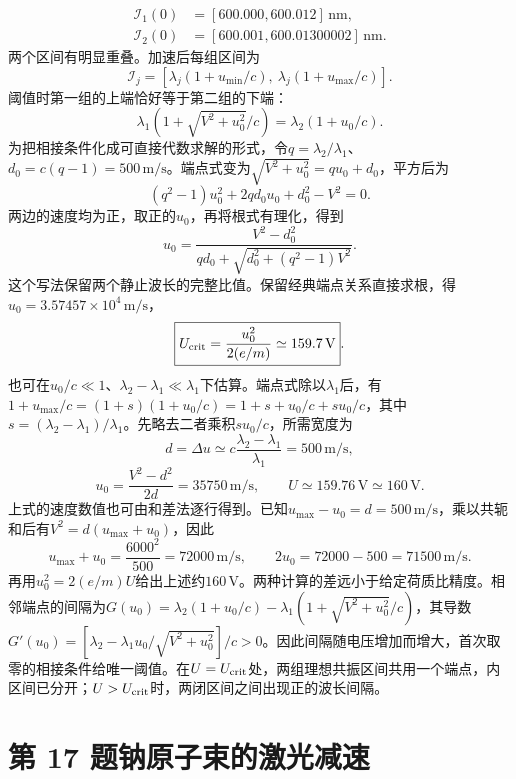 \documentclass[UTF8,fontset=fandol,a4paper,11pt]{ctexart}
\begin{document}
\[
\begin{aligned}
\mathcal I_1(0)&=[600.000,600.012]\,\mathrm{nm},\\
\mathcal I_2(0)&=[600.001,600.01300002]\,\mathrm{nm}.
\end{aligned}
\]
两个区间有明显重叠。加速后每组区间为
\[
\mathcal I_j=[\lambda_j(1+u_{\min}/c),\ \lambda_j(1+u_{\max}/c)].
\]
阈值时第一组的上端恰好等于第二组的下端：
\[
\boxed{\lambda_1(1+\sqrt{V^2+u_0^2}/c)
=\lambda_2(1+u_0/c)}.
\]
为把相接条件化成可直接代数求解的形式，令$q=\lambda_2/\lambda_1$、$d_0=c(q-1)=500\,\mathrm{m/s}$。端点式变为$\sqrt{V^2+u_0^2}=qu_0+d_0$，平方后为
\[
(q^2-1)u_0^2+2qd_0u_0+d_0^2-V^2=0.
\]
两边的速度均为正，取正的$u_0$，再将根式有理化，得到
\[
u_0=\frac{V^2-d_0^2}{qd_0+\sqrt{d_0^2+(q^2-1)V^2}}.
\]
这个写法保留两个静止波长的完整比值。保留经典端点关系直接求根，得$u_0=3.57457\times10^4\,\mathrm{m/s}$，
\[
\boxed{U_{\rm crit}=\frac{u_0^2}{2(e/m)}\simeq159.7\,\mathrm V}.
\]
也可在$u_0/c\ll1$、$\lambda_2-\lambda_1\ll\lambda_1$下估算。端点式除以$\lambda_1$后，有$1+u_{\max}/c=(1+s)(1+u_0/c)=1+s+u_0/c+su_0/c$，其中$s=(\lambda_2-\lambda_1)/\lambda_1$。先略去二者乘积$su_0/c$，所需宽度为
\[
d=\Delta u\simeq c\frac{\lambda_2-\lambda_1}{\lambda_1}=500\,\mathrm{m/s},
\]
\[
u_0=\frac{V^2-d^2}{2d}=35750\,\mathrm{m/s},\qquad
U\simeq159.76\,\mathrm V\simeq160\,\mathrm V.
\]
上式的速度数值也可由和差法逐行得到。已知$u_{\max}-u_0=d=500\,\mathrm{m/s}$，乘以共轭和后有$V^2=d(u_{\max}+u_0)$，因此
\[
u_{\max}+u_0=\frac{6000^2}{500}=72000\,\mathrm{m/s},\qquad
2u_0=72000-500=71500\,\mathrm{m/s}.
\]
再用$u_0^2=2(e/m)U$给出上述约$160\,\mathrm V$。两种计算的差远小于给定荷质比精度。相邻端点的间隔为$G(u_0)=\lambda_2(1+u_0/c)-\lambda_1(1+\sqrt{V^2+u_0^2}/c)$，其导数$G'(u_0)=[\lambda_2-\lambda_1u_0/\sqrt{V^2+u_0^2}]/c>0$。因此间隔随电压增加而增大，首次取零的相接条件给唯一阈值。在$U=U_{\rm crit}$处，两组理想共振区间共用一个端点，内区间已分开；$U>U_{\rm crit}$时，两闭区间之间出现正的波长间隔。




\section*{第 17 题\quad 钠原子束的激光减速}\label{q:17}
\end{document}
